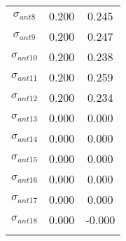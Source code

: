 \documentclass[12pt]{article}
\begin{document}
\begin{table}[h]
\begin{tabular}{ccc}
$\sigma_{ant8}$ &    0.200 &    0.245 \\
$\sigma_{ant9}$ &    0.200 &    0.247 \\
$\sigma_{ant10}$ &    0.200 &    0.238 \\
$\sigma_{ant11}$ &    0.200 &    0.259 \\
$\sigma_{ant12}$ &    0.200 &    0.234 \\
$\sigma_{ant13}$ &    0.000 &    0.000 \\
$\sigma_{ant14}$ &    0.000 &    0.000 \\
$\sigma_{ant15}$ &    0.000 &    0.000 \\
$\sigma_{ant16}$ &    0.000 &    0.000 \\
$\sigma_{ant17}$ &    0.000 &    0.000 \\
$\sigma_{ant18}$ &    0.000 &   -0.000 \\
\\ \hline
\end{tabular}
\end{table}
\end{document}
